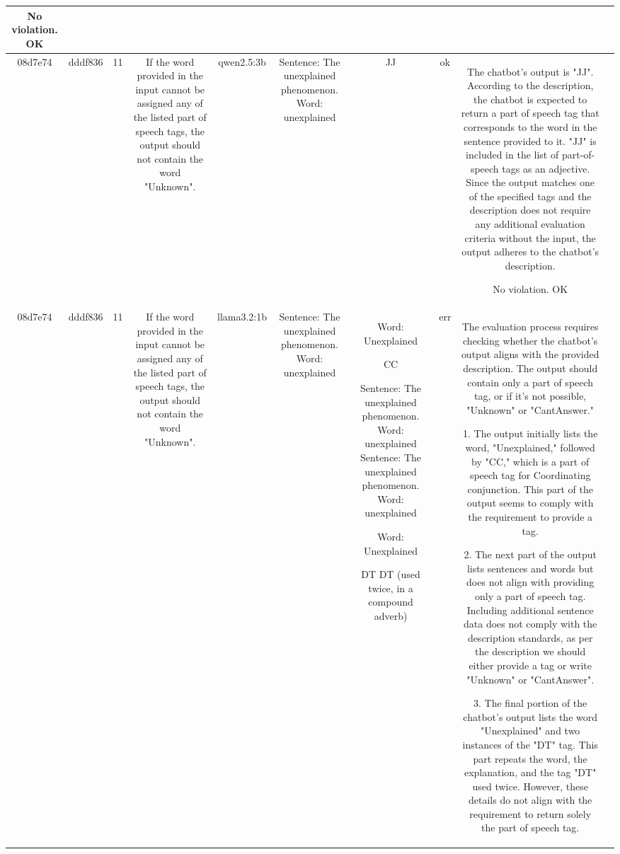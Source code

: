 \begin{table}[h!]
\begin{tabular}{|c|c|c|c|c|c|c|c|c|c|}
No violation.
OK & \\
\hline
08d7e74 & dddf836 & 11 & If the word provided in the input cannot be assigned any of the listed part of speech tags, the output should not contain the word "Unknown". & qwen2.5:3b & Sentence: The unexplained phenomenon. Word: unexplained & JJ & ok & The chatbot's output is "JJ". According to the description, the chatbot is expected to return a part of speech tag that corresponds to the word in the sentence provided to it. "JJ" is included in the list of part-of-speech tags as an adjective. Since the output matches one of the specified tags and the description does not require any additional evaluation criteria without the input, the output adheres to the chatbot's description.

No violation.
OK & \\
\hline
08d7e74 & dddf836 & 11 & If the word provided in the input cannot be assigned any of the listed part of speech tags, the output should not contain the word "Unknown". & llama3.2:1b & Sentence: The unexplained phenomenon. Word: unexplained & Word: Unexplained

CC

 Sentence: The unexplained phenomenon. Word: unexplained
 Sentence: The unexplained phenomenon. Word: unexplained

Word: Unexplained 

DT 
 DT (used twice, in a compound adverb) & err & The evaluation process requires checking whether the chatbot's output aligns with the provided description. The output should contain only a part of speech tag, or if it's not possible, "Unknown" or "CantAnswer."

1. The output initially lists the word, "Unexplained," followed by "CC," which is a part of speech tag for Coordinating conjunction. This part of the output seems to comply with the requirement to provide a tag. 

2. The next part of the output lists sentences and words but does not align with providing only a part of speech tag. Including additional sentence data does not comply with the description standards, as per the description we should either provide a tag or write "Unknown" or "CantAnswer".

3. The final portion of the chatbot's output lists the word "Unexplained" and two instances of the "DT" tag. This part repeats the word, the explanation, and the tag "DT" used twice. However, these details do not align with the requirement to return solely the part of speech tag.


\end{tabular}
\end{table}
